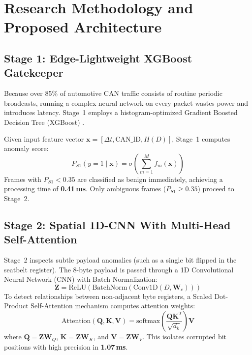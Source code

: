 \documentclass[conference]{IEEEtran}
\begin{document}
\section{Research Methodology and Proposed Architecture}

\subsection{Stage 1: Edge-Lightweight XGBoost Gatekeeper}
Because over 85\% of automotive CAN traffic consists of routine periodic broadcasts, running a complex neural network on every packet wastes power and introduces latency. Stage~1 employs a histogram-optimized Gradient Boosted Decision Tree (XGBoost) \cite{chen2016xgboost}. 

Given input feature vector $\mathbf{x} = [\Delta t, \text{CAN\_ID}, H(D)]$, Stage~1 computes anomaly score:
\begin{equation}
P_{S1}(y = 1 \mid \mathbf{x}) = \sigma \left( \sum_{m=1}^{M} f_m(\mathbf{x}) \right)
\label{eq:xgboost}
\end{equation}
Frames with $P_{S1} < 0.35$ are classified as benign immediately, achieving a processing time of \textbf{0.41\,ms}. Only ambiguous frames ($P_{S1} \ge 0.35$) proceed to Stage~2.

\subsection{Stage 2: Spatial 1D-CNN With Multi-Head Self-Attention}
Stage~2 inspects subtle payload anomalies (such as a single bit flipped in the seatbelt register). The 8-byte payload is passed through a 1D Convolutional Neural Network (CNN) with Batch Normalization:
\begin{equation}
\mathbf{Z} = \text{ReLU}\left(\text{BatchNorm}\left(\text{Conv1D}(D, \mathbf{W}_c)\right)\right)
\end{equation}
To detect relationships between non-adjacent byte registers, a Scaled Dot-Product Self-Attention mechanism \cite{vaswani2017attention} computes attention weights:
\begin{equation}
\text{Attention}(\mathbf{Q}, \mathbf{K}, \mathbf{V}) = \text{softmax}\left(\frac{\mathbf{Q}\mathbf{K}^T}{\sqrt{d_k}}\right)\mathbf{V}
\end{equation}
where $\mathbf{Q} = \mathbf{Z}\mathbf{W}_Q$, $\mathbf{K} = \mathbf{Z}\mathbf{W}_K$, and $\mathbf{V} = \mathbf{Z}\mathbf{W}_V$. This isolates corrupted bit positions with high precision in \textbf{1.07\,ms}.
\end{document}
